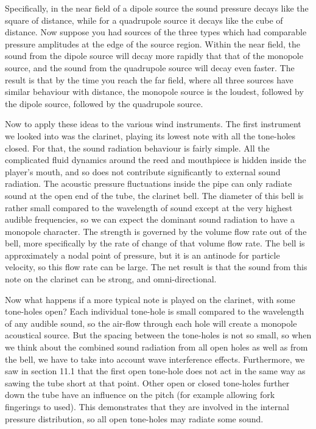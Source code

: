   Specifically, in the near field of a dipole source the sound pressure decays 
  like the square of distance, while for a quadrupole source it decays like the 
  cube of distance. Now suppose you had sources of the three types which had 
  comparable pressure amplitudes at the edge of the source region. Within the 
  near field, the sound from the dipole source will decay more rapidly that 
  that of the monopole source, and the sound from the quadrupole source will 
  decay even faster. The result is that by the time you reach the far field, 
  where all three sources have similar behaviour with distance, the monopole 
  source is the loudest, followed by the dipole source, followed by the 
  quadrupole source. 

  Now to apply these ideas to the various wind instruments. The first 
  instrument we looked into was the clarinet, playing its lowest note with all 
  the tone-holes closed. For that, the sound radiation behaviour is fairly 
  simple. All the complicated fluid dynamics around the reed and mouthpiece is 
  hidden inside the player’s mouth, and so does not contribute significantly to 
  external sound radiation. The acoustic pressure fluctuations inside the pipe 
  can only radiate sound at the open end of the tube, the clarinet bell. The 
  diameter of this bell is rather small compared to the wavelength of sound 
  except at the very highest audible frequencies, so we can expect the dominant 
  sound radiation to have a monopole character. The strength is governed by the 
  volume flow rate out of the bell, more specifically by the rate of change of 
  that volume flow rate. The bell is approximately a nodal point of pressure, 
  but it is an antinode for particle velocity, so this flow rate can be large. 
  The net result is that the sound from this note on the clarinet can be 
  strong, and omni-directional. 

  Now what happens if a more typical note is played on the clarinet, with some 
  tone-holes open? Each individual tone-hole is small compared to the 
  wavelength of any audible sound, so the air-flow through each hole will 
  create a monopole acoustical source. But the spacing between the tone-holes 
  is not so small, so when we think about the combined sound radiation from all 
  open holes as well as from the bell, we have to take into account wave 
  interference effects. Furthermore, we saw in section 11.1 that the first open 
  tone-hole does not act in the same way as sawing the tube short at that 
  point. Other open or closed tone-holes further down the tube have an 
  influence on the pitch (for example allowing fork fingerings to used). This 
  demonstrates that they are involved in the internal pressure distribution, so 
  all open tone-holes may radiate some sound. 

